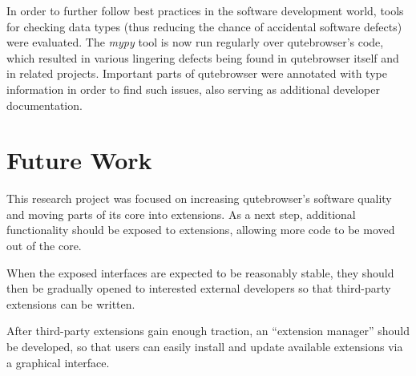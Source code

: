 In order to further follow best practices in the software development world,
tools for checking data types (thus reducing the chance of accidental software
defects) were evaluated. The \emph{mypy} tool is now run regularly over
qutebrowser's code, which resulted in various lingering defects being found in
qutebrowser itself and in related projects. Important parts of qutebrowser were
annotated with type information in order to find such issues, also serving as
additional developer documentation.

\section*{Future Work}
This research project was focused on increasing qutebrowser's software quality
and moving parts of its core into extensions. As a next step, additional
functionality should be exposed to extensions, allowing more code to be moved
out of the core.

When the exposed interfaces are expected to be reasonably stable,
they should then be gradually opened to interested external developers so that
third-party extensions can be written.

After third-party extensions gain enough traction, an ``extension manager''
should be developed, so that users can easily install and update available
extensions via a graphical interface.